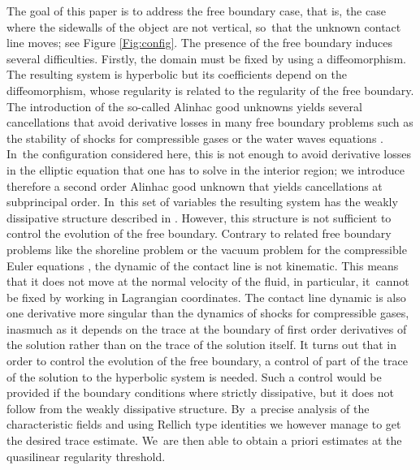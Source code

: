 \documentclass[10pt]{amsart}
\theoremstyle{definition}
\begin{document}
The goal of this paper is to address the free boundary case, that is,
the case where the sidewalls of the object are not vertical, so~that the unknown contact line moves; see Figure \ref{Fig:config}.
The presence of the free boundary induces several difficulties.
Firstly, the domain must be fixed by using a diffeomorphism.
The resulting system is hyperbolic but its coefficients depend on the diffeomorphism, whose regularity is related to the regularity of the free boundary.
The introduction of the so-called Alinhac good unknowns \cite{Alinhac} yields several cancellations that avoid derivative losses in many free boundary problems
such as the stability of shocks for compressible gases \cite{Majda,Metivier} or the water waves equations \cite{Lannes2005,Iguchi,AlazardMetivier}. In~the configuration considered here, this is not enough to avoid derivative losses in the elliptic equation that one has to solve in the interior region;
we introduce therefore a second order Alinhac good unknown that yields cancellations at subprincipal order. In~this set of variables the resulting system has the weakly dissipative structure described in \cite{IguchiLannes2023}.
However, this structure is not sufficient to control the evolution of the free boundary.
Contrary to related free boundary problems like the shoreline problem \cite{LannesMetivier,Poyferre,MingWang} or
the vacuum problem for the compressible Euler equations \cite{CoutandShkoller,JangMasmoudi,IfrimTataru}, the dynamic of the contact line is not kinematic.
This means that it does not move at the normal velocity of the fluid, in particular, it~cannot be fixed by working in Lagrangian coordinates.
The contact line dynamic is also one derivative more singular than the dynamics of shocks for compressible gases,
inasmuch as it depends on the trace at the boundary of first order derivatives of the solution rather than on the trace of the solution itself.
It turns out that in order to control the evolution of the free boundary, a control of part of the trace of the solution to the hyperbolic system is needed.
Such a control would be provided if the boundary conditions where strictly dissipative, but it does not follow from the weakly dissipative structure. By~a precise analysis of the characteristic fields and using Rellich type identities we however manage to get the desired trace estimate. We~are then able to obtain a priori estimates at the quasilinear regularity threshold.
\end{document}
